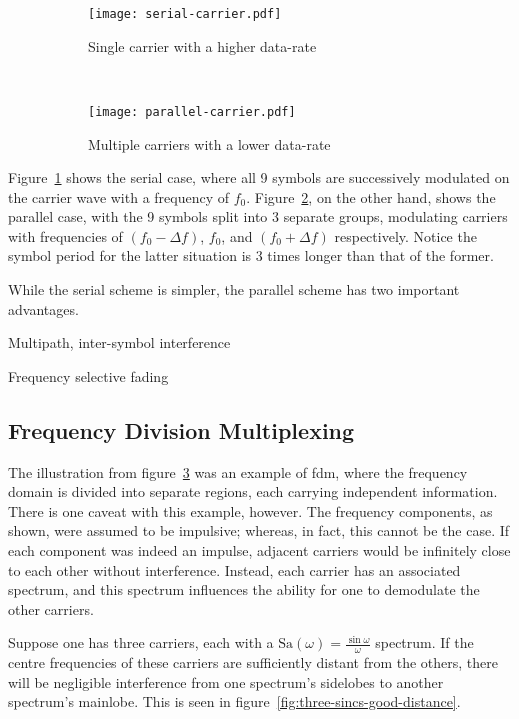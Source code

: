 \documentclass[class=report,11pt,crop=false]{standalone}
\begin{document}
\begin{figure}[htbp]
    \centering
    \begin{subfigure}[t]{0.48\textwidth}
        \centering
        \texttt{[image: serial-carrier.pdf]}
        \caption{Single carrier with a higher data-rate}
        \label{fig:serial-carrier}
    \end{subfigure}%
    ~ 
    \begin{subfigure}[t]{0.48\textwidth}
        \centering
        \texttt{[image: parallel-carrier.pdf]}
        \caption{Multiple carriers with a lower data-rate}
        \label{fig:parallel-carrier}
    \end{subfigure}
    \caption{}
    \label{fig:carrier-illustration}
\end{figure}

Figure~\ref{fig:serial-carrier} shows the serial case, where all 9 symbols are successively modulated on the carrier wave with a frequency of \(f_0\). Figure~\ref{fig:parallel-carrier}, on the other hand, shows the parallel case, with the 9 symbols split into 3 separate groups, modulating carriers with frequencies of \((f_0 - \Delta f)\), \(f_0\), and \((f_0 + \Delta f)\) respectively. Notice the symbol period for the latter situation is 3 times longer than that of the former.

While the serial scheme is simpler, the parallel scheme has two important advantages.

Multipath, inter-symbol interference

Frequency selective fading

\subsection{Frequency Division Multiplexing}
The illustration from figure~\ref{fig:carrier-illustration} was an example of \gls{fdm}, where the frequency domain is divided into separate regions, each carrying independent information. There is one caveat with this example, however. The frequency components, as shown, were assumed to be impulsive; whereas, in fact, this cannot be the case. If each component was indeed an impulse, adjacent carriers would be infinitely close to each other without interference. Instead, each carrier has an associated spectrum, and this spectrum influences the ability for one to demodulate the other carriers.

Suppose one has three carriers, each with a \(\textrm{Sa}(\omega) = \frac{\sin \omega}{\omega}\) spectrum. If the centre frequencies of these carriers are sufficiently distant from the others, there will be negligible interference from one spectrum's sidelobes to another spectrum's mainlobe. This is seen in figure~\ref{fig:three-sincs-good-distance}.
\end{document}
